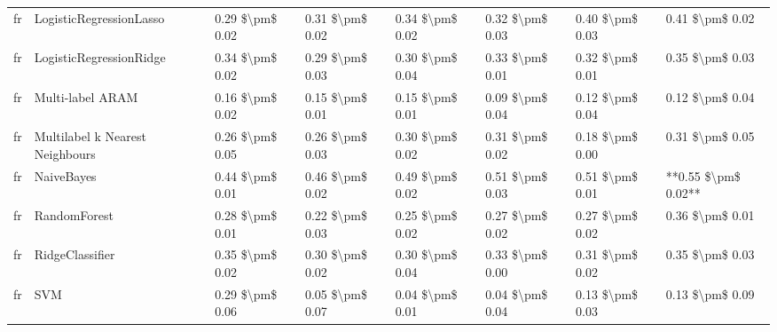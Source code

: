\begin{tabular}{llllllll}
      fr &         LogisticRegressionLasso & 0.29 \$\textbackslash pm\$ 0.02 &           0.31 \$\textbackslash pm\$ 0.02 &       0.34 \$\textbackslash pm\$ 0.02 &        0.32 \$\textbackslash pm\$ 0.03 &                         0.40 \$\textbackslash pm\$ 0.03 &     0.41 \$\textbackslash pm\$ 0.02 \\
      fr &         LogisticRegressionRidge & 0.34 \$\textbackslash pm\$ 0.02 &           0.29 \$\textbackslash pm\$ 0.03 &       0.30 \$\textbackslash pm\$ 0.04 &        0.33 \$\textbackslash pm\$ 0.01 &                         0.32 \$\textbackslash pm\$ 0.01 &     0.35 \$\textbackslash pm\$ 0.03 \\
      fr &                Multi-label ARAM & 0.16 \$\textbackslash pm\$ 0.02 &           0.15 \$\textbackslash pm\$ 0.01 &       0.15 \$\textbackslash pm\$ 0.01 &        0.09 \$\textbackslash pm\$ 0.04 &                         0.12 \$\textbackslash pm\$ 0.04 &     0.12 \$\textbackslash pm\$ 0.04 \\
      fr & Multilabel k Nearest Neighbours & 0.26 \$\textbackslash pm\$ 0.05 &           0.26 \$\textbackslash pm\$ 0.03 &       0.30 \$\textbackslash pm\$ 0.02 &        0.31 \$\textbackslash pm\$ 0.02 &                         0.18 \$\textbackslash pm\$ 0.00 &     0.31 \$\textbackslash pm\$ 0.05 \\
      fr &                      NaiveBayes & 0.44 \$\textbackslash pm\$ 0.01 &           0.46 \$\textbackslash pm\$ 0.02 &       0.49 \$\textbackslash pm\$ 0.02 &        0.51 \$\textbackslash pm\$ 0.03 &                         0.51 \$\textbackslash pm\$ 0.01 & **0.55 \$\textbackslash pm\$ 0.02** \\
      fr &                    RandomForest & 0.28 \$\textbackslash pm\$ 0.01 &           0.22 \$\textbackslash pm\$ 0.03 &       0.25 \$\textbackslash pm\$ 0.02 &        0.27 \$\textbackslash pm\$ 0.02 &                         0.27 \$\textbackslash pm\$ 0.02 &     0.36 \$\textbackslash pm\$ 0.01 \\
      fr &                 RidgeClassifier & 0.35 \$\textbackslash pm\$ 0.02 &           0.30 \$\textbackslash pm\$ 0.02 &       0.30 \$\textbackslash pm\$ 0.04 &        0.33 \$\textbackslash pm\$ 0.00 &                         0.31 \$\textbackslash pm\$ 0.02 &     0.35 \$\textbackslash pm\$ 0.03 \\
      fr &                             SVM & 0.29 \$\textbackslash pm\$ 0.06 &           0.05 \$\textbackslash pm\$ 0.07 &       0.04 \$\textbackslash pm\$ 0.01 &        0.04 \$\textbackslash pm\$ 0.04 &                         0.13 \$\textbackslash pm\$ 0.03 &     0.13 \$\textbackslash pm\$ 0.09 \\

\end{tabular}
